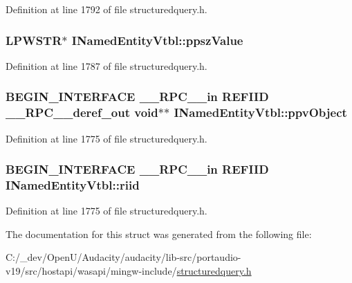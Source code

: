 Definition at line 1792 of file structuredquery.\+h.

\subsubsection[{\texorpdfstring{ppsz\+Value}{ppszValue}}]{ {\bf L\+P\+W\+S\+TR}$\ast$ I\+Named\+Entity\+Vtbl\+::ppsz\+Value}\hypertarget{struct_i_named_entity_vtbl_af4687d30d84b2c5443227d1ec098e88b}{}\label{struct_i_named_entity_vtbl_af4687d30d84b2c5443227d1ec098e88b}


Definition at line 1787 of file structuredquery.\+h.

\subsubsection[{\texorpdfstring{ppv\+Object}{ppvObject}}]{\setlength{\rightskip}{0pt plus 5cm}B\+E\+G\+I\+N\+\_\+\+I\+N\+T\+E\+R\+F\+A\+CE {\bf \+\_\+\+\_\+\+R\+P\+C\+\_\+\+\_\+in} {\bf R\+E\+F\+I\+ID} {\bf \+\_\+\+\_\+\+R\+P\+C\+\_\+\+\_\+deref\+\_\+out} {\bf void}$\ast$$\ast$ I\+Named\+Entity\+Vtbl\+::ppv\+Object}\hypertarget{struct_i_named_entity_vtbl_abdbd2588aed6eb6c059d0f40555bba03}{}\label{struct_i_named_entity_vtbl_abdbd2588aed6eb6c059d0f40555bba03}


Definition at line 1775 of file structuredquery.\+h.

\subsubsection[{\texorpdfstring{riid}{riid}}]{\setlength{\rightskip}{0pt plus 5cm}B\+E\+G\+I\+N\+\_\+\+I\+N\+T\+E\+R\+F\+A\+CE {\bf \+\_\+\+\_\+\+R\+P\+C\+\_\+\+\_\+in} {\bf R\+E\+F\+I\+ID} I\+Named\+Entity\+Vtbl\+::riid}\hypertarget{struct_i_named_entity_vtbl_aec1f6ed4a3d155e3e9f9385e098d6123}{}\label{struct_i_named_entity_vtbl_aec1f6ed4a3d155e3e9f9385e098d6123}


Definition at line 1775 of file structuredquery.\+h.



The documentation for this struct was generated from the following file\+:\begin{DoxyCompactItemize}
\item 
C\+:/\+\_\+dev/\+Open\+U/\+Audacity/audacity/lib-\/src/portaudio-\/v19/src/hostapi/wasapi/mingw-\/include/\hyperlink{structuredquery_8h}{structuredquery.\+h}\end{DoxyCompactItemize}

